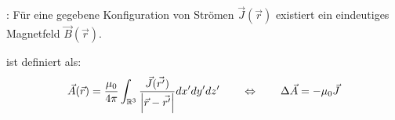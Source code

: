 \vspace{1\baselineskip}

: Für eine gegebene Konfiguration von Strömen $\vec{J}(\vec{r})$
existiert ein eindeutiges Magnetfeld $\vec{B}(\vec{r})$.

\vspace{1\baselineskip}

 ist definiert als:
\begin{align*}
    \vec{A}(\vec{r}) = \frac{\mu_0}{4 \pi} \int_{\mathbb{R}^3} \frac{\vec{J}(\vec{r'})}{\left\vert \vec{r}-\vec{r'} \right\vert} dx' dy' dz'
    \quad \quad \Leftrightarrow \quad \quad \Delta \vec{A} = - \mu_0 \vec{J}
\end{align*}

\vspace{1\baselineskip}


